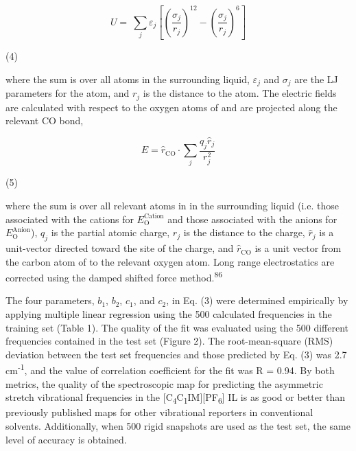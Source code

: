\documentclass[]{article}
\begin{document}
\[U = \ \sum_{j}^{}\varepsilon_{j}\left\lbrack \left( \frac{\sigma_{j}}{r_{j}} \right)^{12} - \left( \frac{\sigma_{j}}{r_{j}} \right)^{6} \right\rbrack\]

(4)

where the sum is over all atoms in the surrounding liquid, \(\varepsilon_{j}\) and \(\sigma_{j}\) are the LJ parameters for the atom, and \(r_{j}\) is the distance to the atom. The electric fields are calculated with respect to the oxygen atoms of  and are projected along the relevant CO bond,

\[E = {\widehat{r}}_{\mathrm{\text{CO}}} \cdot \sum_{j}^{}\frac{q_{j}{\widehat{r}}_{j}}{r_{j}^{2}}\]

(5)

where the sum is over all relevant atoms in in the surrounding liquid (i.e. those associated with the cations for \(E_{\mathrm{O}}^{\text{Cation}}\) and those associated with the anions for \(E_{\mathrm{O}}^{\text{Anion}}\)), \(q_{j}\) is the partial atomic charge, \(r_{j}\) is the distance to the charge, \({\widehat{r}}_{j}\) is a unit-vector directed toward the site of the charge, and \({\widehat{r}}_{\mathrm{\text{CO}}}\) is a unit vector from the carbon atom of  to the relevant oxygen atom. Long range electrostatics are corrected using the damped shifted force method.\textsuperscript{86}

The four parameters, \(b_{1}\), \(b_{2}\), \(c_{1}\), and \(c_{2}\), in Eq. (3) were determined empirically by applying multiple linear regression using the 500 calculated frequencies in the training set (Table 1). The quality of the fit was evaluated using the 500 different frequencies contained in the test set (Figure 2). The root-mean-square (RMS) deviation between the test set frequencies and those predicted by Eq. (3) was 2.7 cm\textsuperscript{-1}, and the value of correlation coefficient for the fit was R = 0.94. By both metrics, the quality of the spectroscopic map for predicting the  asymmetric stretch vibrational frequencies in the {[}C\textsubscript{4}C\textsubscript{1}IM{]}{[}PF\textsubscript{6}{]} IL is as good or better than previously published maps for other vibrational reporters in conventional solvents. Additionally, when 500 rigid  snapshots are used as the test set, the same level of accuracy is obtained.
\end{document}
